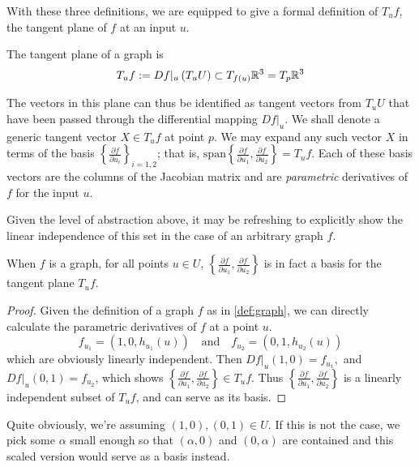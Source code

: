 With these three definitions, we are equipped to give a formal definition of $T_uf$,
the tangent plane of $f$ at an input $u$.
\begin{defn} The tangent plane of a graph is \label{def:tangent-plane}
\[
T_u f := Df\vert_u \left(T_u U\right)
\subset T_{f(u)} \mathbb{R}^3 = T_{p} \mathbb{R}^3
\]
\end{defn}

The vectors in this plane can thus be identified as tangent vectors from $T_uU$ that have been passed through the differential mapping $Df\vert_u$.
We shall denote a generic tangent vector $X \in T_u f$ at point $p$.
We may expand any such vector $X$ in terms of the basis $\left\{ \frac{\partial f}{\partial u_i}\right\}_{i=1,2}$; that is,
$\textrm{span}\left\{ \frac{\partial f}{\partial u_1}, \frac{\partial f}{\partial u_2}\right\} = T_u f$. Each of these basis vectors are the columns of the Jacobian matrix and are \textit{parametric} derivatives of $f$ for the input $u$.  

Given the level of abstraction above, it may be refreshing to explicitly show the linear independence of this set in the case of an arbitrary graph $f$.
\begin{lemma} \label{lemma:f_ui-is-a-basis}
	When $f$ is a graph, for all points $u \in U$, $\left\{\frac{\partial f}{\partial u_1} , \frac{\partial f}{\partial u_2}\right\}$ is in fact a basis for the tangent plane $T_uf$.
\end{lemma}

\begin{proof}
Given the definition of a graph $f$ as in \cref{def:graph}, we can directly calculate the parametric derivatives of $f$ at a point $u$.
\[
f_{u_1} = (1,0,h_{u_1}(u)) \quad\textrm{and}\quad f_{u_2} = (0,1,h_{u_2}(u))
\]
 which are obviously linearly independent.  Then $Df\vert_u (1,0) = f_{u_1} ,$ and $ Df\vert_u (0,1) = f_{u_2}$, which shows $\left\{\frac{\partial f}{\partial u_1} , \frac{\partial f}{\partial u_2}\right\} \in T_uf$.  Thus $\left\{\frac{\partial f}{\partial u_1} , \frac{\partial f}{\partial u_2}\right\}$ is a linearly independent subset of $T_u f$, and can serve as its basis.\end{proof}

Quite obviously, we're assuming $(1,0), (0,1) \in U$. If this is not the case, we pick some $\alpha$ small enough so that $(\alpha,0)$ and $(0,\alpha)$ are contained and this scaled version would serve as a basis instead.


